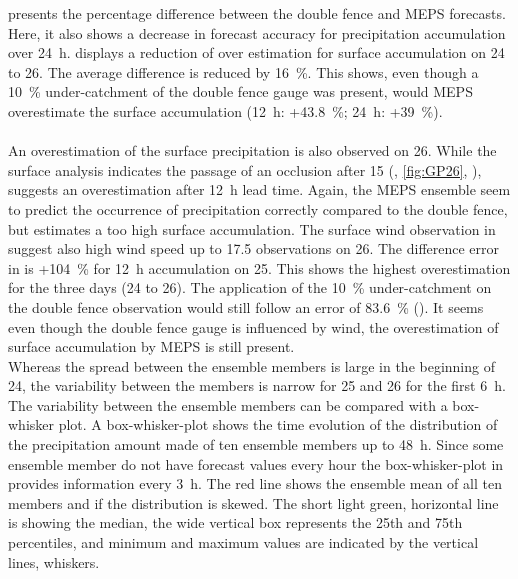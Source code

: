 \noindent
{} presents the percentage difference between the double fence and MEPS forecasts. Here, it also shows a decrease in forecast accuracy for precipitation accumulation over \SI{24}{\hour}.  displays a reduction of over estimation for surface accumulation on \num{24} to \SI{26}{\dec}. The average difference is reduced by \SI{16}{\percent}. This shows, even though a \SI{10}{\percent} under-catchment of the double fence gauge was present, would MEPS overestimate the surface accumulation (\SI{12}{\hour}: +\SI{43.8}{\percent}; \SI{24}{\hour}: +\SI{39}{\percent}).  
\\
\\
An overestimation of the surface precipitation is also observed on \SI{26}{\dec}. While the surface analysis indicates the passage of an occlusion after \SI{15}{\UTC} (, \ref{fig:GP26}, ), suggests  an overestimation after \SI{12}{\hour} lead time. 
Again, the MEPS ensemble seem to predict the occurrence of precipitation correctly compared to the double fence, but estimates a too high surface accumulation.
The surface wind observation in  suggest also high wind speed up to \SI{17.5}{\mPs} observations on \SI{26}{\dec}. The difference error in  is +\SI{104}{\percent} for \SI{12}{\hour} accumulation on \SI{25}{\dec}. This shows the highest overestimation for the three days (\num{24} to \SI{26}{\dec}). The application of the \SI{10}{\percent} under-catchment on the double fence observation would still follow an error of \SI{83.6}{\percent} (). It seems even though the double fence gauge is influenced by wind, the overestimation of surface accumulation by MEPS is still present. 
\\
Whereas the spread between the ensemble members is large in the beginning of \SI{24}{\dec}, the variability between the members is narrow for \num{25} and \SI{26}{\dec} for the first \SI{6}{\hour}. The variability between the ensemble members can be compared with a box-whisker plot. A box-whisker-plot shows the time evolution of the distribution of the precipitation amount made of ten ensemble members up to \SI{48}{\hour}. Since some ensemble member do not have forecast values every hour the box-whisker-plot in  provides information every \SI{3}{\hour}. The red line shows the ensemble mean of all ten members and if the distribution is skewed. The short light green, horizontal line is showing the median, the wide vertical box represents the 25th and 75th percentiles, and minimum and maximum values are indicated by the vertical lines, whiskers.
